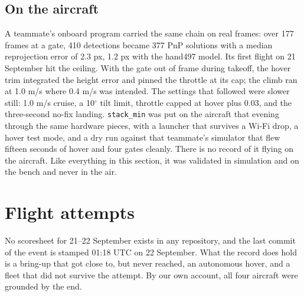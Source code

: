 \documentclass{article}
\begin{document}
\subsection{On the aircraft}
A teammate's onboard program carried the same chain on real frames: over 177 frames at a gate, 410 detections became 377 PnP solutions with a median reprojection error of 2.3 px, 1.2 px with the hand497 model. Its first flight on 21 September hit the ceiling. With the gate out of frame during takeoff, the hover trim integrated the height error and pinned the throttle at its cap; the climb ran at 1.0 m/s where 0.4 m/s was intended. The settings that followed were slower still: 1.0 m/s cruise, a 10$^\circ$ tilt limit, throttle capped at hover plus 0.03, and the three-second no-fix landing. \texttt{stack\_min} was put on the aircraft that evening through the same hardware pieces, with a launcher that survives a Wi-Fi drop, a hover test mode, and a dry run against that teammate's simulator that flew fifteen seconds of hover and four gates cleanly. There is no record of it flying on the aircraft. Like everything in this section, it was validated in simulation and on the bench and never in the air.

\section{Flight attempts}
No scoresheet for 21--22 September exists in any repository, and the last commit of the event is stamped 01:18 UTC on 22 September. What the record does hold is a bring-up that got close to, but never reached, an autonomous hover, and a fleet that did not survive the attempt. By our own account, all four aircraft were grounded by the end.
\end{document}
